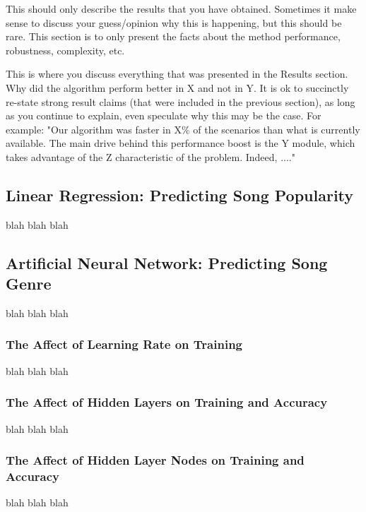 \documentclass[12pt]{article}
\begin{document}
This should only describe the results that you have obtained. Sometimes it make sense
to discuss your guess/opinion why this is happening, but this should be rare. This section is to
only present the facts about the method performance, robustness, complexity, etc.

This is where you discuss everything that was presented in the Results section.
Why did the algorithm perform better in X and not in Y. It is ok to succinctly re-state strong
result claims (that were included in the previous section), as long as you continue to explain,
even speculate why this may be the case. For example: "Our algorithm was faster in X\% of the
scenarios than what is currently available. The main drive behind this performance boost is the
Y module, which takes advantage of the Z characteristic of the problem. Indeed, ...."

\subsection{Linear Regression: Predicting Song Popularity}
\label{subsec:linearRegressionResults}
blah blah blah

\subsection{Artificial Neural Network: Predicting Song Genre}
\label{subsec:annResults}
blah blah blah

\subsubsection{The Affect of Learning Rate on Training}
\label{subsubsec:annLearningRateResults}
blah blah blah

\subsubsection{The Affect of Hidden Layers on Training and Accuracy}
\label{subsubsec:annHiddenLayerResults}
blah blah blah

\subsubsection{The Affect of Hidden Layer Nodes on Training and Accuracy}
\label{subsubsec:annHiddenLayerNodesResults}
blah blah blah
\end{document}
